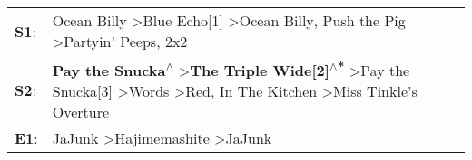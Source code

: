 \begin{supertabular}{p{0.03\textwidth}p{0.92\textwidth}}
 \textbf{S1}:  &                                                                                                                        Ocean Billy\textsuperscript{} \textgreater \enspace Blue Echo[1]\textsuperscript{} \textgreater \enspace Ocean Billy\textsuperscript{}, \enspace Push the Pig\textsuperscript{} \textgreater \enspace Partyin' Peeps\textsuperscript{}, \enspace 2x2\textsuperscript{}  \enspace  \\
 \textbf{S2}:  &  \textbf{Pay the Snucka\textsuperscript{$\wedge$}} \textgreater \enspace \textbf{The Triple Wide[2]\textsuperscript{$\wedge$*}} \textgreater \enspace Pay the Snucka[3]\textsuperscript{} \textgreater \enspace Words\textsuperscript{} \textgreater \enspace Red\textsuperscript{}, \enspace In The Kitchen\textsuperscript{} \textgreater \enspace Miss Tinkle's Overture\textsuperscript{}  \enspace  \\
 \textbf{E1}:  &                                                                                                                                                                                                                                                                 JaJunk\textsuperscript{} \textgreater \enspace Hajimemashite\textsuperscript{} \textgreater \enspace JaJunk\textsuperscript{}  \enspace  \\
\end{supertabular}
